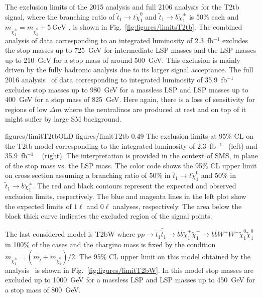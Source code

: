 The exclusion limits of the 2015 analysis \cite{Sirunyan:2016jpr} and full 2106 analysis  \cite{Sirunyan:2017xse} for the T2tb signal, where the branching ratio of $ \tilde{t}_{1} \to t  \tilde{\chi}^{0}_{1} $ and $ \tilde{t}_{1} \to b  \tilde{\chi}^{\pm}_{1} $  is 50\% each and $m_{\tilde{\chi}_{1}^{\pm}} = m_{\tilde{\chi}_{1}^{0}} + 5~\mathrm{GeV}$ , is shown in Fig.~\ref{fig:figures/limitsT2tb}. The combined analysis of data corresponding to an integrated luminosity of 2.3~fb$^{-1}$ excludes the stop masses up to 725~GeV for intermediate LSP masses and the LSP masses up to 210~GeV for a stop mass of around 500~GeV. This exclusion is mainly driven by the fully hadronic analysis due to its larger signal acceptance. The full 2016 analysis~\cite{Sirunyan:2017xse} of data corresponding to integrated luminosity of 35.9~fb$^{-1}$ excludes stop masses up to 980~GeV for a massless LSP and LSP masses up to 400~GeV for a stop mass of 825~GeV. Here again, there is a loss of sensitivity for regions of low $\Delta m$  where the neutralinos are produced at rest and on top of it might suffer by large SM background.

                 {figures/limitT2tbOLD} %
                 {figures/limitT2tb} %
                 {0.49}       %
                 { The exclusion limits at 95\% CL on the T2tb model corresponding to the integrated luminosity of 2.3~fb$^{-1}$~\cite{Sirunyan:2016jpr} (left) and   35.9~fb$^{-1}$ ~\cite{Sirunyan:2017xse} (right). The interpretation is provided in the context of SMS, in plane of the stop mass vs. the LSP mass. The color code shows the 95\% CL upper limit on cross section assuming a branching ratio of 50\% in $ \tilde{t}_{1} \to t  \tilde{\chi}^{0}_{1} $ and 50\% in $ \tilde{t}_{1} \to b  \tilde{\chi}^{\pm}_{1} $. The red and black contours represent the expected and observed exclusion limits, respectively. The blue and magenta lines in the left plot show the expected limits of $1 \ell$ and $0 \ell$ analyses, respectively.  The area below the black thick curve indicates the excluded region of the signal points.  }

The last considered model is T2bW where $ pp \to \tilde{t}_{1} \bar{\tilde{t}}_{1} \to b \bar{b} \tilde{\chi}^{+}_{1} \tilde{\chi}^{-}_{1} \to b \bar{b} W^{+} W^{-} \tilde{\chi}^{0}_{1} \tilde{\chi}^{0}_{1}$ in 100\% of the cases and the chargino mass is fixed by the condition $m_{\tilde{\chi}_{1}^{\pm}} = ( m_{\tilde{t}} +  m_{\tilde{\chi}_{1}^{0}} )/2$. The 95\% CL upper limit on this model obtained by the analysis~\cite{Sirunyan:2017xse} is shown in Fig.~\ref{fig:figures/limitT2bW}. In this model stop masses are excluded up to 1000~GeV for a massless LSP and LSP masses up to 450~GeV for a stop mass of 800~GeV.

